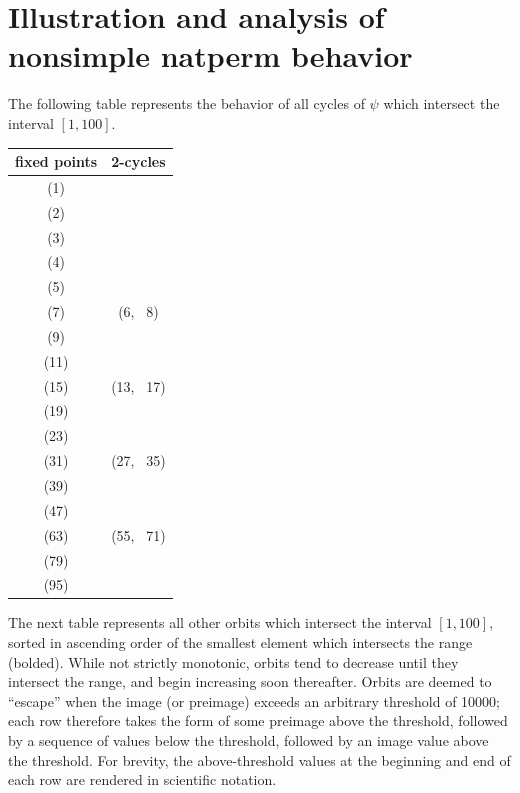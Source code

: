 \documentclass[12pt,reqno]{article}
\begin{document}
\section{Illustration and analysis of nonsimple natperm behavior}

The following table represents the behavior of all cycles of $\psi$ which intersect the interval $ [ 1, 100 ] $. 

\begin{center} \begin{tabular}{|c|c|}
  \hline
  fixed points & 2-cycles \\
  \hline
  (1) & \\
  (2) & \\
  (3) & \\
  (4) & \\
  (5) & \\
  (7) & (6, \, 8) \\
  (9) & \\
  (11) & \\
  (15) & (13, \, 17) \\
  (19) & \\
  (23) & \\
  (31) & (27, \, 35) \\
  (39) & \\
  (47) & \\
  (63) & (55, \, 71) \\
  (79) & \\
  (95) & \\
  \hline
\end{tabular} \end{center}

The next table represents all other orbits which intersect the interval $ [1, 100] $, sorted in ascending order of the smallest element which intersects the range (bolded). While not strictly monotonic, orbits tend to decrease until they intersect the range, and begin increasing soon thereafter. Orbits are deemed to ``escape'' when the image (or preimage) exceeds an arbitrary threshold of 10000; each row therefore takes the form of some preimage above the threshold, followed by a sequence of values below the threshold, followed by an image value above the threshold. For brevity, the above-threshold values at the beginning and end of each row are rendered in scientific notation.
\end{document}
